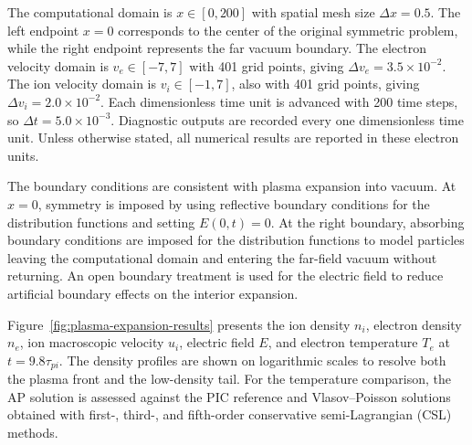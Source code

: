 \documentclass[pdflatex,final,10pt]{article}
\begin{document}
The computational domain is $x\in[0,200]$ with spatial mesh size $\Delta x=0.5$. The left endpoint $x=0$ corresponds to the center of the original symmetric problem, while the right endpoint represents the far vacuum boundary. The electron velocity domain is $v_e\in[-7,7]$ with 401 grid points, giving $\Delta v_e=3.5\times10^{-2}$. The ion velocity domain is $v_i\in[-1,7]$, also with 401 grid points, giving $\Delta v_i=2.0\times10^{-2}$. Each dimensionless time unit is advanced with 200 time steps, so $\Delta t=5.0\times10^{-3}$. Diagnostic outputs are recorded every one dimensionless time unit. Unless otherwise stated, all numerical results are reported in these electron units.

The boundary conditions are consistent with plasma expansion into vacuum. At $x=0$, symmetry is imposed by using reflective boundary conditions for the distribution functions and setting $E(0,t)=0$. At the right boundary, absorbing boundary conditions are imposed for the distribution functions to model particles leaving the computational domain and entering the far-field vacuum without returning. An open boundary treatment is used for the electric field to reduce artificial boundary effects on the interior expansion.

Figure~\ref{fig:plasma-expansion-results} presents the ion density $n_i$, electron density $n_e$, ion macroscopic velocity $u_i$, electric field $E$, and electron temperature $T_e$ at $t=9.8\tau_{pi}$. The density profiles are shown on logarithmic scales to resolve both the plasma front and the low-density tail. For the temperature comparison, the AP solution is assessed against the PIC reference and Vlasov--Poisson solutions obtained with first-, third-, and fifth-order conservative semi-Lagrangian (CSL) methods\cite{yang2021highly}.
\end{document}
